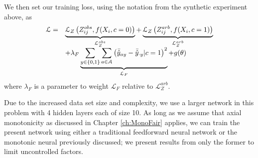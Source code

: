         We then set our training loss, using the notation from the synthetic experiment above, as
            $$\begin{array}{l l}
                \mathcal{L} = & 
                    \underbrace{\mathcal{L}_Z\left(Z_{ij}^{obs}, f(X_i, c = 0)\right)}_{\mathcal{L}_Z^{obs}}
                    + \underbrace{\mathcal{L}_Z\left(Z_{ij}^{arb}, f(X_i, c = 1)\right)}_{\mathcal{L}_Z^{arb}} 
            \\ &    + \lambda_F \underbrace{\sum\limits_{y \in \{0, 1\}} \sum\limits_{a \in \mathcal{A}} \left( \bar{\hat{y}}_{ay} - \bar{\hat{y}}_{\cdot y} | c = 1 \right)^2}_{\mathcal{L}_F} 
                    + g(\theta)
            \end{array} $$
        where $\lambda_F$ is a parameter to weight $\mathcal{L}_F$ relative to $\mathcal{L}_Z^{arb}$.
        
        Due to the increased data set size and complexity, we use a larger network in this problem with 4 hidden layers each of size 10.  As long as we assume that axial monotonicity as discussed in Chapter \ref{ch:MonoFair} applies, we can train the present network using either a traditional feedforward neural network or the monotonic neural previously discussed; we present results from only the former to limit uncontrolled factors.
        
